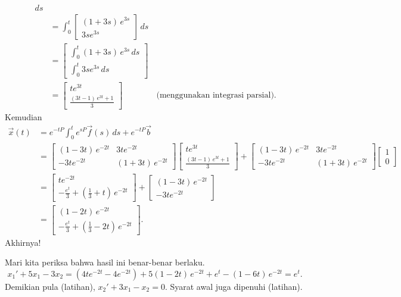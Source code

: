 \begin{example}
\begin{equation*}
\begin{split}
\, ds
\\
& =
\int_0^t
 \begin{bmatrix}
 (1+3s)\,e^{3s} \\
 3se^{3s}
 \end{bmatrix}
\, ds
\\
 &=
 \begin{bmatrix}
 \int_0^t (1+3s)\,e^{3s} \,ds \\
 \int_0^t 3se^{3s} \,ds
 \end{bmatrix}
\\
& =
\begin{bmatrix}
t e^{3t} \\
\frac{(3t-1) \,e^{3t} + 1}{3}
\end{bmatrix} %
\qquad \qquad \text{(menggunakan integrasi parsial).}
\end{split}
\end{equation*}
Kemudian
\begin{equation*}
\begin{split}
\vec{x}(t)
& = e^{-tP} \int_0^t e^{sP}\vec{f}(s) \, ds + e^{-tP} \vec{b} \\
& =
\begin{bmatrix}
(1-3t)\,e^{-2t} & 3te^{-2t} \\
-3te^{-2t} & (1+3t)\,e^{-2t}
\end{bmatrix}
\begin{bmatrix}
t e^{3t} \\
\frac{(3t-1) \,e^{3t} + 1}{3}
\end{bmatrix}
+
\begin{bmatrix}
(1-3t)\,e^{-2t} & 3te^{-2t} \\
-3te^{-2t} & (1+3t)\,e^{-2t}
\end{bmatrix}
\begin{bmatrix} 1 \\ 0 \end{bmatrix} \\
& =
\begin{bmatrix}
te^{-2t} \\
-\frac{e^t}{3}+\left( \frac{1}{3} + t \right) \, e^{-2t}
\end{bmatrix}
+
\begin{bmatrix}
(1-3t)\,e^{-2t} \\
-3te^{-2t}
\end{bmatrix} \\
& =
\begin{bmatrix}
(1-2t)\,e^{-2t} \\
-\frac{e^t}{3}+\left( \frac{1}{3} -2 t \right) \, e^{-2t}
\end{bmatrix} .
\end{split}
\end{equation*}
Akhirnya!

Mari kita periksa bahwa hasil ini benar-benar berlaku.
\begin{equation*}
x_1' + 5 x_1 - 3x_2 = (4te^{-2t} - 4 e^{-2t}) + 5
(1-2t)\,e^{-2t} 
+e^t-( 1 -6 t ) \, e^{-2t} = e^t .
\end{equation*}
Demikian pula (latihan), $x_2' + 3 x_1 - x_2 = 0$.   Syarat awal
juga dipenuhi (latihan).
\end{example}

